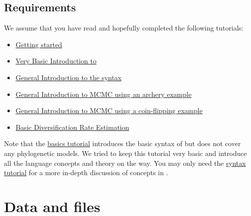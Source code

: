 \subsection*{Requirements}

We assume that you have read and hopefully completed the following tutorials:
\begin{itemize}
\item \href{https://github.com/revbayes/revbayes_tutorial/raw/master/tutorial_TeX/RB_Getting_Started/RB_Getting_Started.pdf}{Getting started}
\item \href{https://github.com/revbayes/revbayes_tutorial/raw/master/tutorial_TeX/RB_Intro_Tutorial/RB_Intro_Tutorial.pdf}{Very Basic Introduction to \Rev}
\item \href{https://github.com/revbayes/revbayes_tutorial/raw/master/tutorial_TeX/RB_Rev_Tutorial/RB_Rev_Tutorial.pdf}{General Introduction to the \Rev syntax}
\item \href{https://github.com/revbayes/revbayes_tutorial/raw/master/tutorial_TeX/RB_MCMC_Archery_Tutorial/RB_MCMC_Archery_Tutorial.pdf}{General Introduction to MCMC using an archery example}
\item \href{https://github.com/revbayes/revbayes_tutorial/raw/master/tutorial_TeX/RB_MCMC_Binomial_Tutorial/RB_MCMC_Binomial_Tutorial.pdf}{General Introduction to MCMC using a coin-flipping example}
\item \href{https://github.com/revbayes/revbayes_tutorial/raw/master/tutorial_TeX/RB_DiversificationRate_Tutorial/RB_DiversificationRate_Tutorial.pdf}{Basic Diversification Rate Estimation}
\end{itemize}
Note that the \href{https://github.com/revbayes/revbayes_tutorial/raw/master/tutorial_TeX/RB_Intro_Tutorial/RB_Intro_Tutorial.pdf}{\Rev basics tutorial} introduces the basic syntax of \Rev but does not cover any phylogenetic models.
We tried to keep this tutorial very basic and introduce all the language concepts and theory on the way.
You may only need the \href{https://github.com/revbayes/revbayes_tutorial/raw/master/tutorial_TeX/RB_Rev_Tutorial/RB_Rev_Tutorial.pdf}{\Rev syntax tutorial} for a more in-depth discussion of concepts in \Rev.

\section*{Data and files} \label{sec:data_files}

